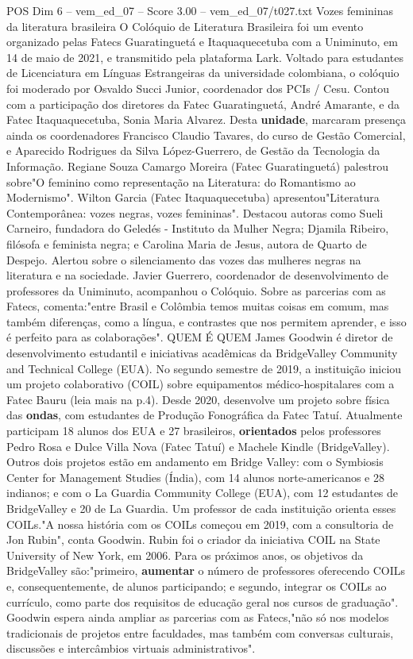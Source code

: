\begin{textsample}{POS Dim 6 – vem\_ed\_07 – Score 3.00 – vem\_ed\_07/t027.txt}  \label{ex:f6_pos_091}
Vozes femininas da literatura brasileira O Colóquio de Literatura Brasileira foi um evento organizado pelas Fatecs Guaratinguetá e Itaquaquecetuba com a Uniminuto, em 14 de maio de 2021, e transmitido pela plataforma Lark.
Voltado para estudantes de Licenciatura em Línguas Estrangeiras da universidade colombiana, o colóquio foi moderado por Osvaldo Succi Junior, coordenador dos PCIs / Cesu.
Contou com a participação dos diretores da Fatec Guaratinguetá, André Amarante, e da Fatec Itaquaquecetuba, Sonia Maria Alvarez.
Desta \textbf{unidade}, marcaram presença ainda os coordenadores Francisco Claudio Tavares, do curso de Gestão Comercial, e Aparecido Rodrigues da Silva López-Guerrero, de Gestão da Tecnologia da Informação.
Regiane Souza Camargo Moreira (Fatec Guaratinguetá) palestrou sobre"O feminino como representação na Literatura: do Romantismo ao Modernismo".
Wilton Garcia (Fatec Itaquaquecetuba) apresentou"Literatura Contemporânea: vozes negras, vozes femininas".
Destacou autoras como Sueli Carneiro, fundadora do Geledés - Instituto da Mulher Negra; Djamila Ribeiro, filósofa e feminista negra; e Carolina Maria de Jesus, autora de Quarto de Despejo.
Alertou sobre o silenciamento das vozes das mulheres negras na literatura e na sociedade.
Javier Guerrero, coordenador de desenvolvimento de professores da Uniminuto, acompanhou o Colóquio.
Sobre as parcerias com as Fatecs, comenta:"entre Brasil e Colômbia temos muitas coisas em comum, mas também diferenças, como a língua, e contrastes que nos permitem aprender, e isso é perfeito para as colaborações".
QUEM É QUEM James Goodwin é diretor de desenvolvimento estudantil e iniciativas acadêmicas da BridgeValley Community and Technical College (EUA).
No segundo semestre de 2019, a instituição iniciou um projeto colaborativo (COIL) sobre equipamentos médico-hospitalares com a Fatec Bauru (leia mais na p.4).
Desde 2020, desenvolve um projeto sobre física das \textbf{ondas}, com estudantes de Produção Fonográfica da Fatec Tatuí.
Atualmente participam 18 alunos dos EUA e 27 brasileiros, \textbf{orientados} pelos professores Pedro Rosa e Dulce Villa Nova (Fatec Tatuí) e Machele Kindle (BridgeValley).
Outros dois projetos estão em andamento em Bridge Valley: com o Symbiosis Center for Management Studies (Índia), com 14 alunos norte-americanos e 28 indianos; e com o La Guardia Community College (EUA), com 12 estudantes de BridgeValley e 20 de La Guardia.
Um professor de cada instituição orienta esses COILs."A nossa história com os COILs começou em 2019, com a consultoria de Jon Rubin", conta Goodwin.
Rubin foi o criador da iniciativa COIL na State University of New York, em 2006.
Para os próximos anos, os objetivos da BridgeValley são:"primeiro, \textbf{aumentar} o número de professores oferecendo COILs e, consequentemente, de alunos participando; e segundo, integrar os COILs ao currículo, como parte dos requisitos de educação geral nos cursos de graduação".
Goodwin espera ainda ampliar as parcerias com as Fatecs,"não só nos modelos tradicionais de projetos entre faculdades, mas também com conversas culturais, discussões e intercâmbios virtuais administrativos".

\end{textsample}
